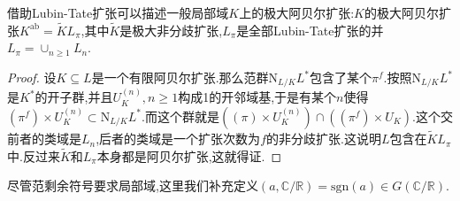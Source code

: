 借助Lubin-Tate扩张可以描述一般局部域$K$上的极大阿贝尔扩张:$K$的极大阿贝尔扩张$K^{\mathrm{ab}}=\widetilde{K}L_{\pi}$,其中$\widetilde{K}$是极大非分歧扩张,$L_{\pi}$是全部Lubin-Tate扩张的并$L_{\pi}=\cup_{n\ge1}L_n$.
\begin{proof}
	
	设$K\subseteq L$是一个有限阿贝尔扩张.那么范群$\mathrm{N}_{L/K}L^*$包含了某个$\pi^f$.按照$\mathrm{N}_{L/K}L^*$是$K^*$的开子群,并且$U_K^{(n)},n\ge1$构成1的开邻域基,于是有某个$n$使得$(\pi^f)\times U_K^{(n)}\subset\mathrm{N}_{L/K}L^*$.而这个群就是$\left((\pi)\times U_K^{(n)}\right)\cap\left((\pi^f)\times U_K\right)$.这个交前者的类域是$L_n$,后者的类域是一个扩张次数为$f$的非分歧扩张.这说明$L$包含在$\widetilde{K}L_{\pi}$中.反过来$\widetilde{K}$和$L_{\pi}$本身都是阿贝尔扩张,这就得证.
\end{proof}

尽管范剩余符号要求局部域,这里我们补充定义$(a,\mathbb{C}/\mathbb{R})=\mathrm{sgn}(a)\in G(\mathbb{C}/\mathbb{R})$.

